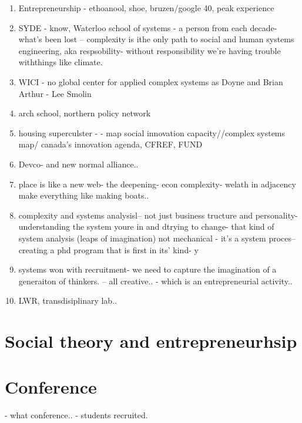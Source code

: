 \begin{enumerate}
    \item Entrepreneurship - ethoanool, shoe, bruzen/google 40, peak experience 
    \item SYDE - know, Waterloo school of systems - a person from each decade- what's been lost -- complexity is ithe only path to social and human systems engineering, aka respsobility- without responsibility we're having trouble withthings like climate.
    \item WICI - no global center for applied complex systems as Doyne and Brian Arthur - Lee Smolin
    \item arch school, northern policy network
    \item housing superculster -  - map social innovation capacity//complex systems map/ canada's innovation agenda, CFREF, FUND
    \item Devco- and new normal alliance.. 
    \item place is like a new web- the deepening- econ complexity- welath in adjacency  make everything like making boats..
    \item complexity and systems analysisl-- not just business tructure and personality- understanding the system youre in and dtrying to change- that kind of system analysis (leaps of imagination) not mechanical - it's a system proces-- creating a phd program that is first in its' kind- y
    \item systems won with recruitment- we need to capture the imagination of a generaiton of thinkers. -- all creative.. - which is an entrepreneurial activity.. \item LWR, transdisiplinary lab..
\end{enumerate}

\section{Social theory and entrepreneurhsip}




\section{Conference}

- what conference..
- students recruited.




